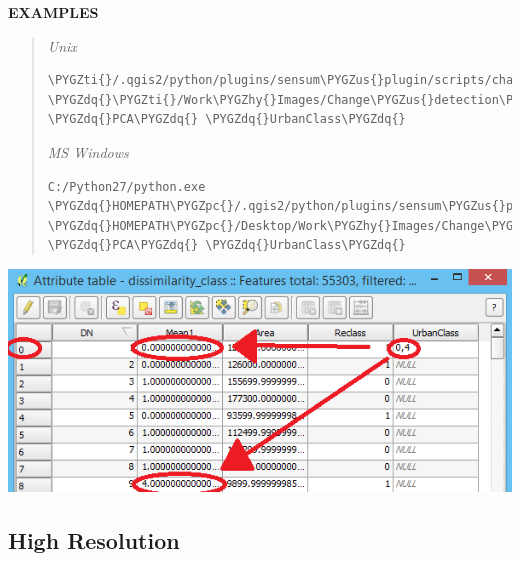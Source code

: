 \documentclass[letterpaper,10pt,english]{sphinxmanual}
\def\PYGZus{\char`\_}
\def\PYGZpc{\char`\%}
\def\PYGZhy{\char`\-}
\def\PYGZdq{\char`\"}
\def\PYGZti{\char`\~}
\begin{document}
\textbf{EXAMPLES}
\begin{quote}

\emph{Unix}

\begin{Verbatim}[frame=single,commandchars=\\\{\}]
\PYGZti{}/.qgis2/python/plugins/sensum\PYGZus{}plugin/scripts/change\PYGZus{}detection.py \PYGZdq{}\PYGZti{}/Work\PYGZhy{}Images/Change\PYGZus{}detection\PYGZus{}Izmir\PYGZdq{} \PYGZdq{}PCA\PYGZdq{} \PYGZdq{}UrbanClass\PYGZdq{}
\end{Verbatim}

\emph{MS Windows}

\begin{Verbatim}[frame=single,commandchars=\\\{\}]
C:/Python27/python.exe \PYGZdq{}HOMEPATH\PYGZpc{}/.qgis2/python/plugins/sensum\PYGZus{}plugin/scripts/change\PYGZus{}detection.py\PYGZdq{} \PYGZdq{}HOMEPATH\PYGZpc{}/Desktop/Work\PYGZhy{}Images/Change\PYGZus{}detection\PYGZus{}Izmir\PYGZdq{} \PYGZdq{}PCA\PYGZdq{} \PYGZdq{}UrbanClass\PYGZdq{}
\end{Verbatim}
\end{quote}

\includegraphics{change_detection.png}


\subsection{High Resolution}
\label{user:high-resolution}
\end{document}
